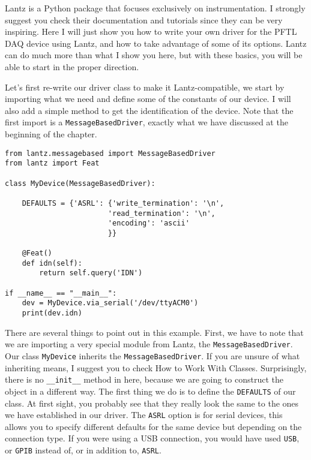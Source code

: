 Lantz is a Python package that focuses exclusively on instrumentation. I
strongly suggest you check their documentation and tutorials since they
can be very inspiring. Here I will just show you how to write your own
driver for the {PFTL} {DAQ} device using Lantz, and how to take
advantage of some of its options. Lantz can do much more than what I
show you here, but with these basics, you will be able to start in the
proper direction.

Let's first re-write our driver class to make it Lantz-compatible, we
start by importing what we need and define some of the constants of our
device. I will also add a simple method to get the identification of the
device. Note that the first import is a \texttt{MessageBasedDriver},
exactly what we have discussed at the beginning of the chapter.

\begin{verbatim}
from lantz.messagebased import MessageBasedDriver
from lantz import Feat

class MyDevice(MessageBasedDriver):

    DEFAULTS = {'ASRL': {'write_termination': '\n',
                        'read_termination': '\n',
                        'encoding': 'ascii'
                        }}

    @Feat()
    def idn(self):
        return self.query('IDN')

if __name__ == "__main__":
    dev = MyDevice.via_serial('/dev/ttyACM0')
    print(dev.idn)
\end{verbatim}

There are several things to point out in this example. First, we have to
note that we are importing a very special module from Lantz, the
\texttt{MessageBasedDriver}. Our class \texttt{MyDevice} inherits the
\texttt{MessageBasedDriver}. If you are unsure of what inheriting means,
I suggest you to check How to Work With Classes. Surprisingly, there is
no \texttt{\_\_init\_\_} method in here, because we are going to
construct the object in a different way. The first thing we do is to
define the \texttt{DEFAULTS} of our class. At first sight, you probably
see that they really look the same to the ones we have established in
our driver. The \texttt{ASRL} option is for serial devices, this allows
you to specify different defaults for the same device but depending on
the connection type. If you were using a {USB} connection, you would
have used \texttt{USB}, or \texttt{GPIB} instead of, or in
addition to, \texttt{ASRL}.

